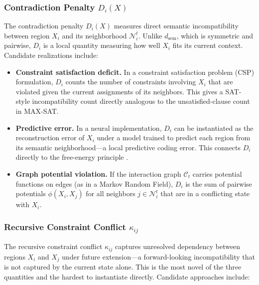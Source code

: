 \documentclass[11pt, a4paper]{article}
\theoremstyle{srn}
\theoremstyle{srnremark}
\newcommand{\Cstruct}{\mathcal{C}}           %
\newcommand{\Nhd}{\mathcal{N}}           %
\newcommand{\dsem}{d_{\mathrm{sem}}}  %
\begin{document}
\subsubsection*{Contradiction Penalty $D_i(X)$}

The contradiction penalty $D_i(X)$ measures direct semantic
incompatibility between region $X_i$ and its neighborhood
$\Nhd_i^t$.
Unlike $\dsem$, which is symmetric and pairwise, $D_i$ is a local
quantity measuring how well $X_i$ fits its current context.
Candidate realizations include:

\begin{itemize}
  \item \textbf{Constraint satisfaction deficit.}
    In a constraint satisfaction problem (CSP) formulation, $D_i$
    counts the number of constraints involving $X_i$ that are violated
    given the current assignments of its neighbors.
    This gives a SAT-style incompatibility count directly analogous to
    the unsatisfied-clause count in MAX-SAT.

  \item \textbf{Predictive error.}
    In a neural implementation, $D_i$ can be instantiated as the
    reconstruction error of $X_i$ under a model trained to predict
    each region from its semantic neighborhood---a local predictive
    coding error.
    This connects $D_i$ directly to the free-energy principle
    \citep{friston2010free}.

  \item \textbf{Graph potential violation.}
    If the interaction graph $\Cstruct_t$ carries potential functions
    on edges (as in a Markov Random Field), $D_i$ is the sum of
    pairwise potentials $\phi(X_i, X_j)$ for all neighbors $j \in
    \Nhd_i^t$ that are in a conflicting state with $X_i$.
\end{itemize}

\subsubsection*{Recursive Constraint Conflict $\kappa_{ij}$}

The recursive constraint conflict $\kappa_{ij}$ captures unresolved
dependency between regions $X_i$ and $X_j$ under future extension---a
forward-looking incompatibility that is not captured by the current
state alone.
This is the most novel of the three quantities and the hardest to
instantiate directly.
Candidate approaches include:
\end{document}
